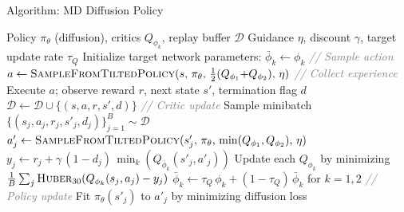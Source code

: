 \documentclass[aspectratio=169,11pt]{beamer}
\begin{document}
\begin{frame}{Algorithm: MD Diffusion Policy}
\begin{fitcenter}
\begin{algorithmic}[1]
\REQUIRE Policy $\pi_\theta$ (diffusion), critics $Q_{\phi_k}$, replay buffer $\mathcal{D}$
\REQUIRE Guidance $\eta$, discount $\gamma$, target update rate $\tau_Q$
\STATE Initialize target network parameters: $\bar{\phi}_k \leftarrow \phi_k$
  \STATE \textcolor{gray}{\textit{// Sample action}}
  \STATE $a \leftarrow \textsc{SampleFromTiltedPolicy}(s,\, \pi_\theta,\, \tfrac{1}{2}(Q_{\phi_1}{+}Q_{\phi_2}),\, \eta)$ 
  \STATE \textcolor{gray}{\textit{// Collect experience}}
  \STATE Execute $a$; observe reward $r$, next state $s'$, termination flag $d$
  \STATE $\mathcal{D} \leftarrow \mathcal{D} \cup \{(s, a, r, s', d)\}$
  \STATE \textcolor{gray}{\textit{// Critic update}}
  \STATE Sample minibatch $\{(s_j, a_j, r_j, s'_j, d_j)\}_{j=1}^B \sim \mathcal{D}$
  \STATE $a'_j \leftarrow \textsc{SampleFromTiltedPolicy}(s'_j,\, \pi_\theta,\, \min(Q_{\phi_1},Q_{\phi_2}),\, \eta)$ 
  \STATE $y_j \leftarrow r_j + \gamma\,(1{-}d_j)\,\min_k(Q_{\bar{\phi}_k}(s'_j, a'_j))$
  \STATE Update each $Q_{\phi_k}$ by minimizing $\frac{1}{B}\sum_j \textsc{Huber}_{30}(Q_{\phi_k}(s_j, a_j) - y_j)$
  \STATE $\bar{\phi}_k \leftarrow \tau_Q\,\phi_k + (1{-}\tau_Q)\,\bar{\phi}_k$ for $k{=}1,2$ 
  \STATE \textcolor{gray}{\textit{// Policy update}}
  \STATE Fit $\pi_\theta(s'_j)$ to $a'_j$ by minimizing diffusion loss
\ENDFOR
\end{algorithmic}
\end{fitcenter}
\end{frame}
\end{document}
